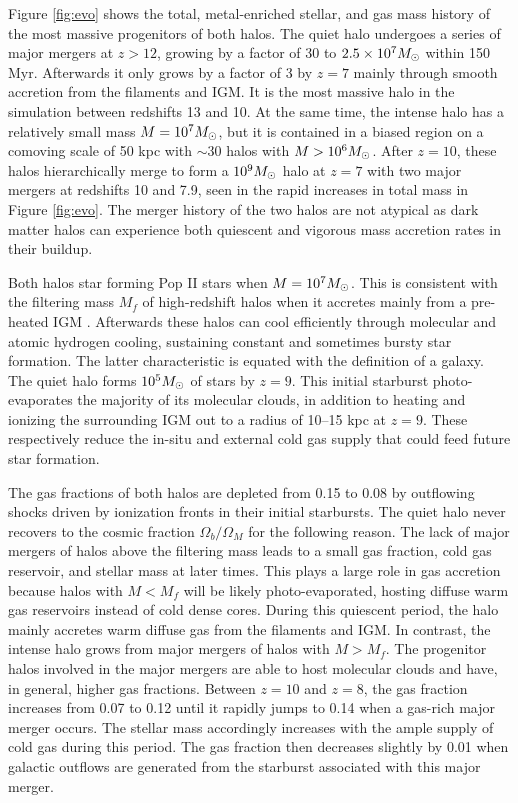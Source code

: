 \documentclass[apjl]{emulateapj}
\begin{document}
Figure \ref{fig:evo} shows the total, metal-enriched stellar, and gas
mass history of the most massive progenitors of both halos.  The quiet
halo undergoes a series of major mergers at $z > 12$, growing by a
factor of 30 to $2.5 \times 10^7 \Ms$ within 150 Myr.  Afterwards it
only grows by a factor of 3 by $z=7$ mainly through smooth accretion
from the filaments and IGM.  It is the most massive halo in the
simulation between redshifts 13 and 10.  At the same time, the intense
halo has a relatively small mass $M = 10^7 \Ms$, but it is contained
in a biased region on a comoving scale of 50 kpc with $\sim30$ halos
with $M > 10^6 \Ms$.  After $z=10$, these halos hierarchically merge
to form a $10^9 \Ms$ halo at $z=7$ with two major mergers at redshifts
10 and 7.9, seen in the rapid increases in total mass in Figure
\ref{fig:evo}.  The merger history of the two halos are not atypical
as dark matter halos can experience both quiescent and vigorous mass
accretion rates in their buildup.

Both halos star forming Pop II stars when $M = 10^7 \Ms$.  This is
consistent with the filtering mass $M_f$ of high-redshift halos when
it accretes mainly from a pre-heated IGM \citep{gnedin98, gnedin00,
  Wise08_Gal}.  Afterwards these halos can cool efficiently through
molecular and atomic hydrogen cooling, sustaining constant and
sometimes bursty star formation.  The latter characteristic is equated
with the definition of a galaxy.  The quiet halo forms $10^5 \Ms$ of
stars by $z=9$.  This initial starburst photo-evaporates the majority
of its molecular clouds, in addition to heating and ionizing the
surrounding IGM out to a radius of 10--15 kpc at $z=9$.  These
respectively reduce the in-situ and external cold gas supply that
could feed future star formation.

The gas fractions of both halos are depleted from 0.15 to 0.08 by
outflowing shocks driven by ionization fronts in their initial
starbursts.  The quiet halo never recovers to the cosmic fraction
$\Omega_b/\Omega_M$ for the following reason.  The lack of major
mergers of halos above the filtering mass leads to a small gas
fraction, cold gas reservoir, and stellar mass at later times.  This
plays a large role in gas accretion because halos with $M < M_f$ will
be likely photo-evaporated, hosting diffuse warm gas reservoirs
instead of cold dense cores.  During this quiescent period, the halo
mainly accretes warm diffuse gas from the filaments and IGM.  In
contrast, the intense halo grows from major mergers of halos with $M >
M_f$.  The progenitor halos involved in the major mergers are able to
host molecular clouds and have, in general, higher gas fractions.
Between $z=10$ and $z=8$, the gas fraction increases from 0.07 to 0.12
until it rapidly jumps to 0.14 when a gas-rich major merger occurs.
The stellar mass accordingly increases with the ample supply of cold
gas during this period.  The gas fraction then decreases slightly by
0.01 when galactic outflows are generated from the starburst
associated with this major merger.
\end{document}
